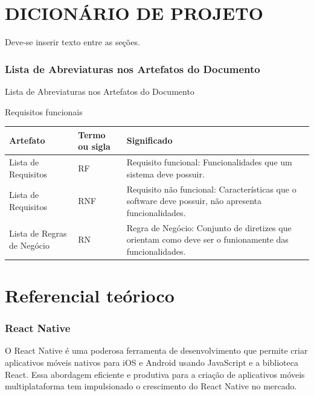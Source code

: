 \chapter{DICIONÁRIO DE PROJETO}\label{cap:desenvolvimento}
Deve-se inserir texto entre as seções.
\subsection{Lista de Abreviaturas nos Artefatos do Documento}
Lista de Abreviaturas nos Artefatos do Documento
\begin{quadro}[htb]
	\centering
	\caption{\label{Formatação do texto.}Requisitos funcionais}	
	\begin{tabular}{|p{4cm}|m{3cm}|p{7cm}|}
		\hline
		\textbf{Artefato} & \textbf{Termo ou sigla} & \textbf{Significado} \\ \hline
		Lista de Requisitos & RF & Requisito funcional: Funcionalidades que um sistema deve possuir. \\ \hline
		Lista de Requisitos & RNF & Requisito não funcional: Características que o software deve possuir, não apresenta funcionalidades. \\ \hline
		Lista de Regras de Negócio & RN & Regra de Negócio: Conjunto de diretizes que orientam como deve ser o funionamente das funcionalidades. \\ \hline
	\end{tabular}
\end{quadro}


\chapter{Referencial teórioco}\label{cap:desenvolvimento}

\subsection{React Native}
O React Native é uma poderosa ferramenta de desenvolvimento que permite criar aplicativos móveis nativos para iOS e Android usando JavaScript e a biblioteca React. Essa abordagem eficiente e produtiva para a criação de aplicativos móveis multiplataforma tem impulsionado o crescimento do React Native no mercado.

